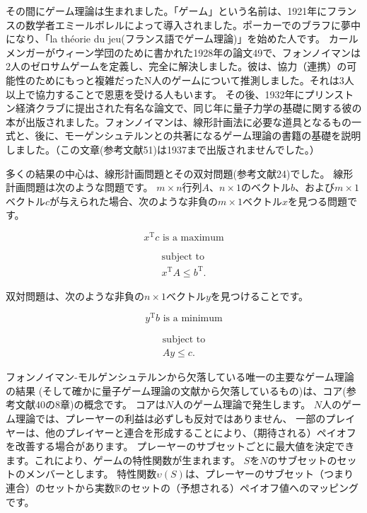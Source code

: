 その間にゲーム理論は生まれました。「ゲーム」という名前は、1921年にフランスの数学者エミールボレルによって導入されました。ポーカーでのブラフに夢中になり、「la théorie du jeu(フランス語でゲーム理論)」を始めた人です。
カールメンガーがウィーン学団のために書かれた1928年の論文49で、フォンノイマンは2人のゼロサムゲームを定義し、完全に解決しました。彼は、協力（連携）の可能性のためにもっと複雑だったN人のゲームについて推測しました。それは3人以上で協力することで恩恵を受ける人もいます。
その後、1932年にプリンストン経済クラブに提出された有名な論文で、同じ年に量子力学の基礎に関する彼の本が出版されました。フォンノイマンは、線形計画法に必要な道具となるもの一式と、後に、モーゲンシュテルンとの共著になるゲーム理論の書籍の基礎を説明しました。（この文章(参考文献51)は1937まで出版されませんでした。）

多くの結果の中心は、線形計画問題とその双対問題(参考文献24)でした。
線形計画問題は次のような問題です。
$m \times n$行列$A$、$n \times 1$のベクトル$b$、および$m \times 1$ベクトル$c$が与えられた場合、次のような非負の$m \times 1$ベクトル$x$を見つる問題です。

\begin{equation}
\label{3}
x^{\mathrm{T}}c \text{ is a maximum}
\end{equation}

\begin{eqnarray}
\label{4}
\text{subject to} \nonumber \\
x^{\mathrm{T}} A \leq b^{\mathrm{T}} .
\end{eqnarray}

双対問題は、次のような非負の$n \times 1$ベクトル$y$を見つけることです。

\begin{equation}
\label{5}
y^{\mathrm{T}} b  \text{ is a minimum}
\end{equation}

\begin{eqnarray}
\label{6}
\text{subject to} \nonumber \\
Ay \leq c.
\end{eqnarray}

フォンノイマン-モルゲンシュテルンから欠落している唯一の主要なゲーム理論の結果
(そして確かに量子ゲーム理論の文献から欠落しているもの)は、コア(参考文献40の8章)の概念です。
コアは$N$人のゲーム理論で発生します。
$N$人のゲーム理論では、プレーヤーの利益は必ずしも反対ではありません、
一部のプレイヤーは、他のプレイヤーと連合を形成することにより、（期待される）ペイオフを改善する場合があります。
プレーヤーのサブセットごとに最大値を決定できます。これにより、ゲームの特性関数が生まれます。
$S$を$N$のサブセットのセットのメンバーとします。
特性関数$\upsilon (S)$は、プレーヤーのサブセット（つまり連合）のセットから実数$\mathbb{R}$のセットの（予想される）ペイオフ値へのマッピングです。


